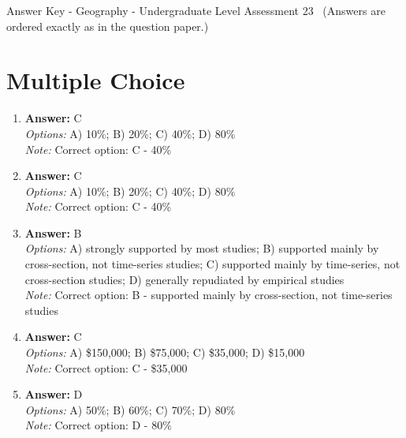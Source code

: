\documentclass[12pt]{article}
\begin{document}
\begin{center}
Answer Key - Geography - Undergraduate Level Assessment 23 \
\small (Answers are ordered exactly as in the question paper.)
\end{center}

\section*{Multiple Choice}
\begin{enumerate}[label=\arabic*.]
\item \textbf{Answer:} C
\\ \textit{Options:} A) 10\%; B) 20\%; C) 40\%; D) 80\%
\\ \textit{Note:} Correct option: C - 40\%
\item \textbf{Answer:} C
\\ \textit{Options:} A) 10\%; B) 20\%; C) 40\%; D) 80\%
\\ \textit{Note:} Correct option: C - 40\%
\item \textbf{Answer:} B
\\ \textit{Options:} A) strongly supported by most studies; B) supported mainly by cross-section, not time-series studies; C) supported mainly by time-series, not cross-section studies; D) generally repudiated by empirical studies
\\ \textit{Note:} Correct option: B - supported mainly by cross-section, not time-series studies
\item \textbf{Answer:} C
\\ \textit{Options:} A) \$150,000; B) \$75,000; C) \$35,000; D) \$15,000
\\ \textit{Note:} Correct option: C - \$35,000
\item \textbf{Answer:} D
\\ \textit{Options:} A) 50\%; B) 60\%; C) 70\%; D) 80\%
\\ \textit{Note:} Correct option: D - 80\%
\end{enumerate}
\end{document}
